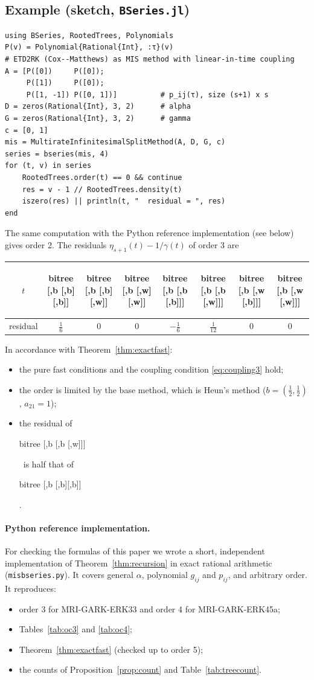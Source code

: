 \documentclass[11pt,a4paper]{article}
\theoremstyle{definition}
\theoremstyle{remark}
\newcommand{\btree}[1]{\begin{forest}bitree #1\end{forest}}
\newcommand{\Tbbb}{\btree{[,b [,b][,b]]}}
\newcommand{\Tbbw}{\btree{[,b [,b][,w]]}}
\newcommand{\Tbww}{\btree{[,b [,w][,w]]}}
\newcommand{\Tbbbl}{\btree{[,b [,b [,b]]]}}
\newcommand{\Tbbwl}{\btree{[,b [,b [,w]]]}}
\newcommand{\Tbwbl}{\btree{[,b [,w [,b]]]}}
\newcommand{\Tbwwl}{\btree{[,b [,w [,w]]]}}
\begin{document}
\subsection{Example (sketch, \texttt{BSeries.jl})}

{\small
\begin{verbatim}
using BSeries, RootedTrees, Polynomials
P(v) = Polynomial{Rational{Int}, :τ}(v)
# ETD2RK (Cox--Matthews) as MIS method with linear-in-time coupling
A = [P([0])     P([0]);
     P([1])     P([0]);
     P([1, -1]) P([0, 1])]          # p_ij(τ), size (s+1) x s
D = zeros(Rational{Int}, 3, 2)      # alpha
G = zeros(Rational{Int}, 3, 2)      # gamma
c = [0, 1]
mis = MultirateInfinitesimalSplitMethod(A, D, G, c)
series = bseries(mis, 4)
for (t, v) in series
    RootedTrees.order(t) == 0 && continue
    res = v - 1 // RootedTrees.density(t)
    iszero(res) || println(t, "  residual = ", res)
end
\end{verbatim}
}
\noindent The same computation with the Python reference implementation
(see below) gives order 2. The residuals
$\eta_{s+1}(t)-1/\gamma(t)$ of order 3 are
\begin{center}
\begin{tabular}{cccccccc}
\toprule
$t$ & \Tbbb & \Tbbw & \Tbww & \Tbbbl & \Tbbwl & \Tbwbl & \Tbwwl\\\midrule
residual & $\frac16$ & $0$ & $0$ & $-\frac16$ & $\frac1{12}$ & $0$ & $0$\\
\bottomrule
\end{tabular}
\end{center}
In accordance with Theorem~\ref{thm:exactfast}:
\begin{itemize}
\item the pure fast conditions and the coupling condition
  \eqref{eq:coupling3} hold;
\item the order is limited by the base method, which is Heun's method
  ($b=(\frac12,\frac12)$, $a_{21}=1$);
\item the residual of \Tbbwl\ is half that of \Tbbb.
\end{itemize}

\paragraph{Python reference implementation.}
For checking the formulas of this paper we wrote a short, independent
implementation of Theorem~\ref{thm:recursion} in exact rational
arithmetic (\texttt{misbseries.py}). It covers general $\alpha$,
polynomial $g_{ij}$ and $p_{ij}$, and arbitrary order. It reproduces:
\begin{itemize}
\item order 3 for MRI-GARK-ERK33 and order 4 for MRI-GARK-ERK45a;
\item Tables~\ref{tab:oc3} and \ref{tab:oc4};
\item Theorem~\ref{thm:exactfast} (checked up to order 5);
\item the counts of Proposition~\ref{prop:count} and
  Table~\ref{tab:treecount}.
\end{itemize}
\end{document}
